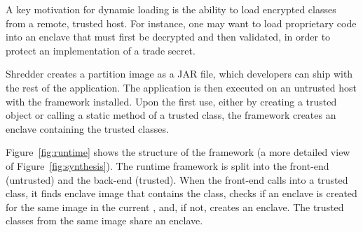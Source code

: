


\label{sec:concept:loading}

A key motivation for dynamic loading is the ability to load encrypted
classes from a remote, trusted host. 
For instance, one may want to load proprietary code into an enclave
that must first be decrypted and then validated, in order to 
protect an implementation of a trade secret.

Shredder creates a partition image as a JAR file, which
developers can ship with the rest of the application.
The application is then executed on an untrusted host with the 
\sysname{} \dynamicphase{} framework installed.
Upon the first use, either by creating a trusted object or calling a static method of a trusted class,
the \sysname{} \dynamicphase{} framework creates an enclave containing the trusted classes.


Figure~\ref{fig:runtime} shows the structure of the \sysname{} \dynamicphase{} framework (a more detailed view of Figure~\ref{fig:synthesis}).
The \sysname{} runtime framework is split into the front-end (untrusted) and the back-end (trusted).
When the front-end calls into a trusted class,
it finds enclave image that contains the class,
checks if an enclave is created for the same image in the current \jvm{},
and, if not, creates an enclave.
The trusted classes from the same image share an enclave.

